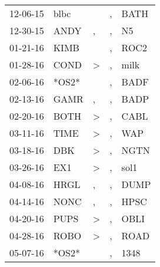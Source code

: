 \begin{supertabular}{p{0.07\textwidth}p{0.06\textwidth}p{0.02\textwidth}p{0.02\textwidth}p{0.06\textwidth}}
          12-06-15\textsuperscript{} &  blbc\textsuperscript{} &               &                , &  BATH\textsuperscript{} \\
          12-30-15\textsuperscript{} &  ANDY\textsuperscript{} &             , &                , &    N5\textsuperscript{} \\
          01-21-16\textsuperscript{} &  KIMB\textsuperscript{} &               &                , &  ROC2\textsuperscript{} \\
          01-28-16\textsuperscript{} &  COND\textsuperscript{} &  \textgreater &                , &  milk\textsuperscript{} \\
          02-06-16\textsuperscript{} &                   *OS2* &               &                , &  BADF\textsuperscript{} \\
          02-13-16\textsuperscript{} &  GAMR\textsuperscript{} &             , &                , &  BADP\textsuperscript{} \\
          02-20-16\textsuperscript{} &  BOTH\textsuperscript{} &  \textgreater &                , &  CABL\textsuperscript{} \\
          03-11-16\textsuperscript{} &  TIME\textsuperscript{} &  \textgreater &                , &   WAP\textsuperscript{} \\
          03-18-16\textsuperscript{} &   DBK\textsuperscript{} &  \textgreater &                , &  NGTN\textsuperscript{} \\
          03-26-16\textsuperscript{} &   EX1\textsuperscript{} &  \textgreater &                , &  sol1\textsuperscript{} \\
          04-08-16\textsuperscript{} &  HRGL\textsuperscript{} &             , &                , &  DUMP\textsuperscript{} \\
          04-14-16\textsuperscript{} &  NONC\textsuperscript{} &             , &                , &  HPSC\textsuperscript{} \\
          04-20-16\textsuperscript{} &  PUPS\textsuperscript{} &  \textgreater &                , &  OBLI\textsuperscript{} \\
          04-28-16\textsuperscript{} &  ROBO\textsuperscript{} &  \textgreater &                , &  ROAD\textsuperscript{} \\
          05-07-16\textsuperscript{} &                   *OS2* &               &                , &  1348\textsuperscript{} \\

\end{supertabular}
